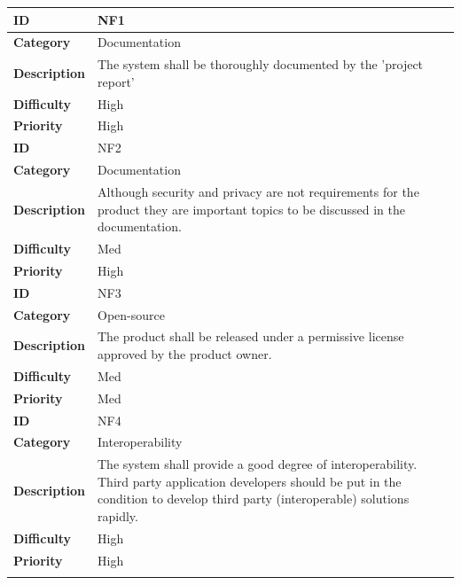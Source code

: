 \begin{table}[H]
\begin{center}
\begin{tabular}{ | l | p{11.5cm} | }
  \hline
  
  \textbf{ID} & NF1 \\
  \hline\noalign{\smallskip}\hline
  \textbf{Category}			&	Documentation\\
  \textbf{Description}	& The system shall be thoroughly documented by the 'project report' \\
  \textbf{Difficulty}		& High \\
  \textbf{Priority}			& High \\
  \hline\noalign{\smallskip}\noalign{\smallskip}\hline

  \textbf{ID} & NF2 \\
  \hline\noalign{\smallskip}\hline
  \textbf{Category}			&	Documentation\\
  \textbf{Description}	& Although security and privacy are not requirements for the product they
													are important topics to be discussed in the documentation. \\
  \textbf{Difficulty}		& Med \\
  \textbf{Priority}			& High \\
  \hline\noalign{\smallskip}\noalign{\smallskip}\hline

  \textbf{ID} & NF3 \\
  \hline\noalign{\smallskip}\hline
  \textbf{Category}			&	Open-source\\
  \textbf{Description}	& The product shall be released under a permissive license approved by the product owner. \\
  \textbf{Difficulty}		& Med \\
  \textbf{Priority}			& Med \\
  \hline\noalign{\smallskip}\noalign{\smallskip}\hline
  
  \textbf{ID} & NF4 \\
  \hline\noalign{\smallskip}\hline
  \textbf{Category}			&	Interoperability \\
  \textbf{Description}	& The system shall provide a good degree of interoperability.
  												Third party application developers should be put in the condition to develop
  												third party (interoperable) solutions rapidly. \\
  \textbf{Difficulty}		& High \\
  \textbf{Priority}			& High \\
  \hline\noalign{\smallskip}\noalign{\smallskip}\hline


\end{tabular}
\end{center}
\end{table}
